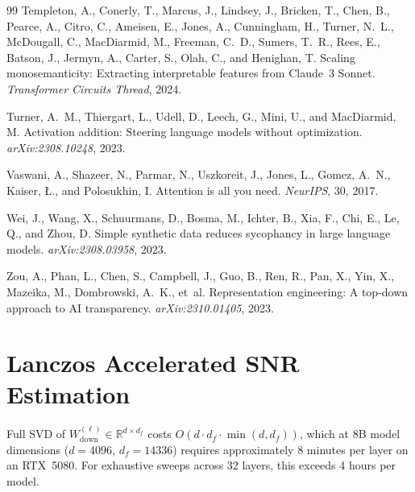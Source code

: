 \documentclass{article}
\begin{document}
\begin{thebibliography}{99}
Templeton, A., Conerly, T., Marcus, J., Lindsey, J., Bricken, T.,
 Chen, B., Pearce, A., Citro, C., Ameisen, E., Jones, A., Cunningham, H.,
 Turner, N.~L., McDougall, C., MacDiarmid, M., Freeman, C.~D.,
 Sumers, T.~R., Rees, E., Batson, J., Jermyn, A., Carter, S.,
 Olah, C., and Henighan, T.
\newblock Scaling monosemanticity: Extracting interpretable features
 from {Claude~3 Sonnet}.
\newblock \emph{Transformer Circuits Thread}, 2024.

Turner, A.~M., Thiergart, L., Udell, D., Leech, G., Mini, U., and
 MacDiarmid, M.
\newblock Activation addition: Steering language models without
 optimization.
\newblock \emph{arXiv:2308.10248}, 2023.

Vaswani, A., Shazeer, N., Parmar, N., Uszkoreit, J., Jones, L.,
 Gomez, A.~N., Kaiser, {\L}., and Polosukhin, I.
\newblock Attention is all you need.
\newblock \emph{NeurIPS}, 30, 2017.

Wei, J., Wang, X., Schuurmans, D., Bosma, M., Ichter, B., Xia, F.,
 Chi, E., Le, Q., and Zhou, D.
\newblock Simple synthetic data reduces sycophancy in large language
 models.
\newblock \emph{arXiv:2308.03958}, 2023.

Zou, A., Phan, L., Chen, S., Campbell, J., Guo, B., Ren, R., Pan, X.,
 Yin, X., Mazeika, M., Dombrowski, A.~K., et~al.
\newblock Representation engineering: A top-down approach to {AI}
 transparency.
\newblock \emph{arXiv:2310.01405}, 2023.

\end{thebibliography}

\newpage


\appendix

\section{Lanczos Accelerated SNR Estimation}
\label{app:lanczos}

Full SVD of $W_\mathrm{down}^{(\ell)} \in \mathbb{R}^{d \times d_f}$
costs $O(d \cdot d_f \cdot \min(d, d_f))$, which at 8B model
dimensions ($d{=}4096$, $d_f{=}14336$) requires approximately 8
minutes per layer on an RTX~5080. For exhaustive sweeps across 32
layers, this exceeds 4 hours per model.
\end{document}
